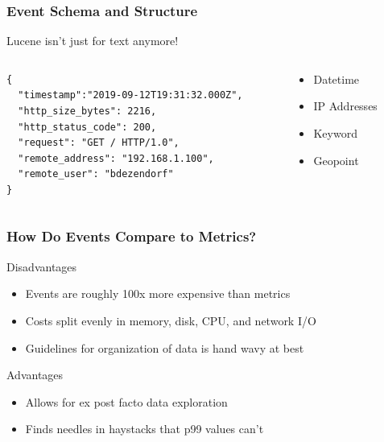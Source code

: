 \begin{frame}[fragile]
    \frametitle{Event Schema and Structure}

    \begin{center}
        Lucene isn't just for text anymore!
    \end{center}

    \begin{columns}
        \begin{column}{0.5\textwidth}
    \begin{lstlisting}
{
  "timestamp":"2019-09-12T19:31:32.000Z",
  "http_size_bytes": 2216,
  "http_status_code": 200,
  "request": "GET / HTTP/1.0",
  "remote_address": "192.168.1.100",
  "remote_user": "bdezendorf"
}
    \end{lstlisting}
        \end{column}

        \begin{column}{0.5\textwidth}
            \begin{itemize}
                \item Datetime
                \item IP Addresses
                \item Keyword
                \item Geopoint
            \end{itemize}
        \end{column}
    \end{columns}
\end{frame}

\begin{frame}
    \frametitle{How Do Events Compare to Metrics?}

    Disadvantages

    \begin{itemize}
        \item Events are roughly 100x more expensive than metrics
        \item Costs split evenly in memory, disk, CPU, and network I/O
        \item Guidelines for organization of data is hand wavy at best
    \end{itemize}

    Advantages

    \begin{itemize}
      \item Allows for ex post facto data exploration
      \item Finds needles in haystacks that p99 values can't
    \end{itemize}
\end{frame}

